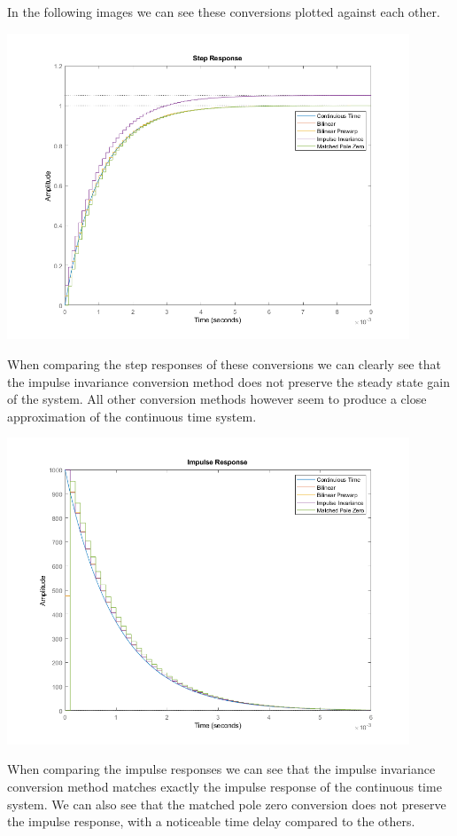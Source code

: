 \documentclass[a4paper,11pt]{article}
\begin{document}
\begin{preview}
\begin{enumerate}
In the following images we can see these conversions plotted against each other.

\begin{center}
  \includegraphics[width=0.9\textwidth]{A_1/3_step.png}
\end{center}

When comparing the step responses of these conversions we can clearly see that the impulse invariance conversion method does not preserve the steady state gain of the system. All other conversion methods however seem to produce a close approximation of the continuous time system.

\begin{center}
  \includegraphics[width=0.9\textwidth]{A_1/3_impulse.png}
\end{center}

When comparing the impulse responses we can see that the impulse invariance conversion method matches exactly the impulse response of the continuous time system. We can also see that the matched pole zero conversion does not preserve the impulse response, with a noticeable time delay compared to the others. 


\end{enumerate}
\end{preview}
\end{document}
